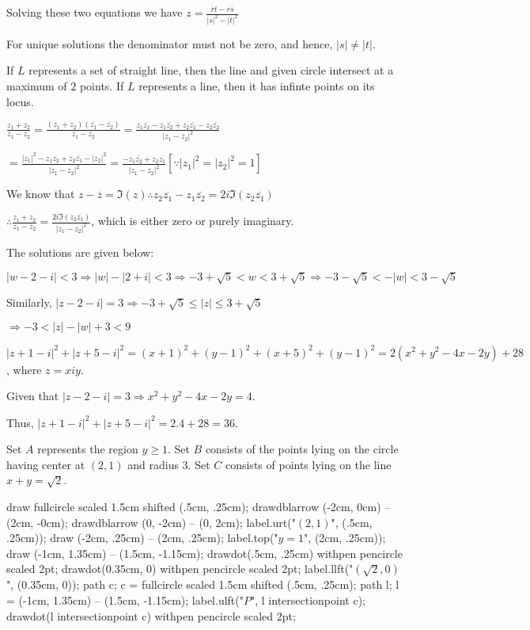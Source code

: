   Solving these two equations we have $z = \frac{\overline{r}t - r\overline{s}}{|s|^2 - |t|^2}$

  For unique solutions the denominator must not be zero, and hence, $|s|\neq |t|$.

  If $L$ represents a set of straight line, then the line and given circle intersect at a maximum of $2$
  points. If $L$ represents a line, then it has infinte points on its locus.
\item $\frac{z_1 + z_2}{z_1 - z_2} = \frac{(z_1 + z_2)(\overline{z_1} - \overline{z_2})}{\overline{z_1} -
  \overline{z_2}} = \frac{z_1\overline{z_1} - z_1\overline{z_2} + z_2\overline{z_1} -
  z_2\overline{z_2}}{|z_1 - z_2|^2}$

  $= \frac{|z_1|^2 - z_1\overline{z_2} + z_2\overline{z_1} - |z_2|^2}{|z_1 - z_2|^2} = \frac{-
  z_1\overline{z_2} + z_2\overline{z_1}}{|z_1 - z_2|^2}[\because |z_1|^2 = |z_2|^2 = 1]$

  We know that $z - \overline{z} = \Im(z)\therefore z_2\overline{z_1} - z_1\overline{z_2} =
  2i\Im(z_2\overline{z_1})$

  $\therefore \frac{z_1 + z_2}{z_1 - z_2} = \frac{2i\Im(z_2\overline{z_1})}{|z_1 - z_2|^2}$, which is either
  zero or purely imaginary.
\item The solutions are given below:
  \startitemize[i]
  \item $|w - 2 - i| < 3\Rightarrow |w| - |2 + i| < 3 \Rightarrow -3 + \sqrt{5}< w < 3 + \sqrt{5}\Rightarrow
    -3 - \sqrt{5} < -|w|< 3 - \sqrt{5}$

    Similarly, $|z - 2 - i| = 3\Rightarrow -3 + \sqrt{5} \leq |z|\leq 3 + \sqrt{5}$

    $\Rightarrow -3< |z| - |w| + 3< 9$
  \item $|z + 1 - i|^2 + |z + 5 - i|^2 = (x + 1)^2 + (y - 1)^2 + (x + 5)^2 + (y - 1)^2 = 2(x^2 + y^2 - 4x -
    2y) + 28$, where $z = x  iy$.

    Given that $|z - 2 - i| = 3 \Rightarrow x^2 + y^2 - 4x - 2y = 4$.

    Thus, $|z + 1 - i|^2 + |z + 5 - i|^2 = 2.4 + 28 = 36$.
  \item Set $A$ represents the region $y\geq 1$. Set $B$ consists of the points lying on the circle having
    center at $(2, 1)$ and radius $3$. Set $C$ consists of points lying on the line $x + y = \sqrt{2}$.

    \startplacefigure[location=force]
      \startMPcode
        draw fullcircle scaled 1.5cm shifted (.5cm, .25cm);
        drawdblarrow (-2cm, 0cm) -- (2cm, -0cm);
        drawdblarrow (0, -2cm) -- (0, 2cm);
        label.urt("$(2, 1)$", (.5cm, .25cm));
        draw (-2cm, .25cm) -- (2cm, .25cm);
        label.top("$y = 1$", (2cm, .25cm));
        draw (-1cm, 1.35cm) -- (1.5cm, -1.15cm);
        drawdot(.5cm, .25cm) withpen pencircle scaled 2pt;
        drawdot(0.35cm, 0)  withpen pencircle scaled 2pt;
        label.llft("$(\sqrt{2}, 0)$", (0.35cm, 0));
        path c;
        c = fullcircle scaled 1.5cm shifted (.5cm, .25cm);
        path l;
        l = (-1cm, 1.35cm) -- (1.5cm, -1.15cm);
        label.ulft("$P$", l intersectionpoint c);
        drawdot(l intersectionpoint c) withpen pencircle scaled 2pt;
      \stopMPcode
    \stopplacefigure

